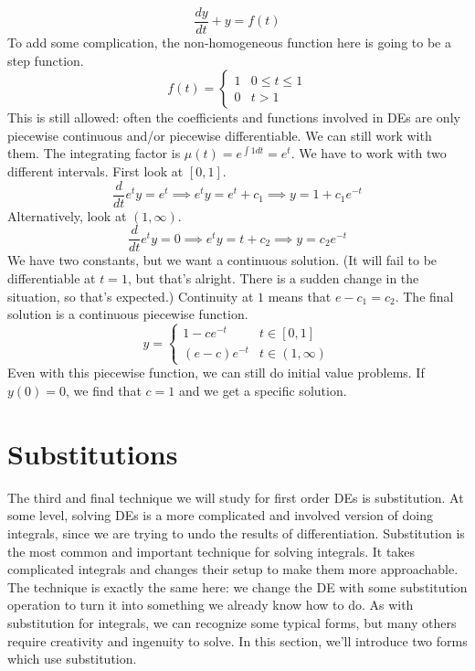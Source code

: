 \documentclass[fleqn,letterpaper]{report}
\begin{document}
\begin{example}
\begin{equation*}
\frac{dy}{dt} + y = f(t)
\end{equation*}
To add some complication, the non-homogeneous function here
is going to be a step function.
\begin{equation*}
f(t) = \left\{ \begin{matrix} 1 & 0 \leq t \leq 1 \\ 0 & t > 1
\end{matrix} \right. 
\end{equation*}
This is still allowed: often the coefficients and functions
involved in DEs are only piecewise continuous and/or piecewise
differentiable. We can still work with them. The integrating
factor is $\mu(t) = e^{\int 1 dt} = e^t$.  We have to work
with two different intervals. First look at  $[0,1]$.
\begin{equation*}
\frac{d}{dt} e^t y = e^t \implies e^ty = e^t + c_1 \implies y = 1
+ c_1e^{-t} 
\end{equation*}
Alternatively, look at $(1,\infty)$.
\begin{equation*}
\frac{d}{dt} e^t y = 0 \implies e^ty = t + c_2 \implies y =
c_2e^{-t} 
\end{equation*}
We have two constants, but we want a continuous solution.
(It will fail to be differentiable at $t=1$, but that's alright.
There is a sudden change in the situation, so that's expected.)
Continuity at $1$ means that $e-c_1 = c_2$. The final
solution is a continuous piecewise function.
\begin{equation*}
y = \left\{ \begin{matrix} 1 - ce^{-t} & t \in [0,1] \\
(e-c)e^{-t} & t \in (1,\infty) \end{matrix} \right.
\end{equation*}
Even with this piecewise function, we can still do initial
value problems. If $y(0) =0$, we find
that $c=1$ and we get a specific solution.
\end{example}

\section{Substitutions}
\label{substitutions}

The third and final technique we will study for first order
DEs is substitution. At some level, solving DEs is a more
complicated and involved version of doing integrals, since we
are trying to undo the results of differentiation.
Substitution is the most common and important technique for
solving integrals. It takes complicated integrals and changes
their setup to make them more approachable. The technique is
exactly the same here: we change the DE with some substitution
operation to turn it into something we already know how to do.
As with substitution for integrals, we can recognize some
typical forms, but many others require creativity and
ingenuity to solve. In this section, we'll introduce two forms
which use substitution.
\end{document}
